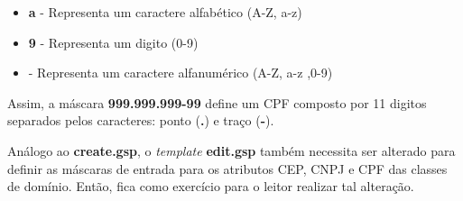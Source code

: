 \begin{itemize}

\vspace{0.3cm}

\item {\bf a} - Representa um caractere alfabético (A-Z, a-z)

\vspace{0.3cm}

\item {\bf 9} - Representa um digito (0-9)

\vspace{0.3cm}

\item {\bf *} - Representa um caractere alfanumérico (A-Z, a-z ,0-9)

\end{itemize}

\vspace{0.3cm}

Assim,  a máscara {\bf  999.999.999-99} define  um CPF  composto por  11 digitos
separados pelos caracteres: ponto ({\bf .}) e traço ({\bf -}).  

\vspace{0.3cm}

\begin{remark}
Análogo ao  {\bf create.gsp}, o  {\it template} {\bf edit.gsp}  também necessita
ser alterado para  definir as máscaras de entrada para os  atributos CEP, CNPJ e
CPF das classes  de domínio.  Então, fica como exercício  para o leitor realizar
tal alteração.
\end{remark}

